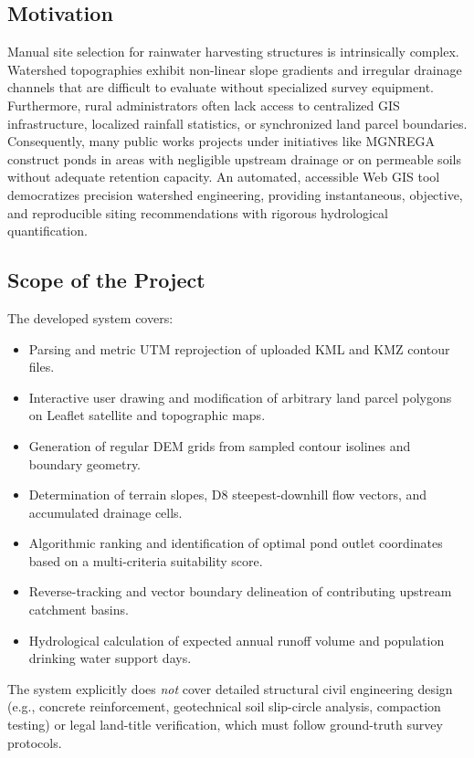 \documentclass[manuscript,screen,review]{acmart}
\begin{document}
\subsection{Motivation}
Manual site selection for rainwater harvesting structures is intrinsically complex. Watershed topographies exhibit non-linear slope gradients and irregular drainage channels that are difficult to evaluate without specialized survey equipment. Furthermore, rural administrators often lack access to centralized GIS infrastructure, localized rainfall statistics, or synchronized land parcel boundaries. Consequently, many public works projects under initiatives like MGNREGA construct ponds in areas with negligible upstream drainage or on permeable soils without adequate retention capacity. An automated, accessible Web GIS tool democratizes precision watershed engineering, providing instantaneous, objective, and reproducible siting recommendations with rigorous hydrological quantification.

\subsection{Scope of the Project}
The developed system covers:
\begin{itemize}
    \item Parsing and metric UTM reprojection of uploaded KML and KMZ contour files.
    \item Interactive user drawing and modification of arbitrary land parcel polygons on Leaflet satellite and topographic maps.
    \item Generation of regular DEM grids from sampled contour isolines and boundary geometry.
    \item Determination of terrain slopes, D8 steepest-downhill flow vectors, and accumulated drainage cells.
    \item Algorithmic ranking and identification of optimal pond outlet coordinates based on a multi-criteria suitability score.
    \item Reverse-tracking and vector boundary delineation of contributing upstream catchment basins.
    \item Hydrological calculation of expected annual runoff volume and population drinking water support days.
\end{itemize}
The system explicitly does \emph{not} cover detailed structural civil engineering design (e.g., concrete reinforcement, geotechnical soil slip-circle analysis, compaction testing) or legal land-title verification, which must follow ground-truth survey protocols.
\end{document}
